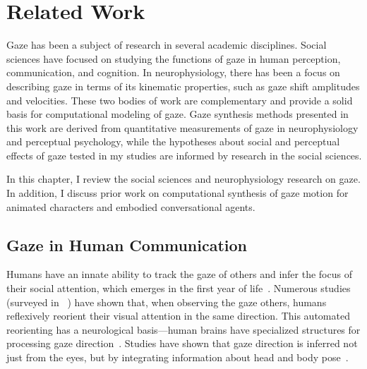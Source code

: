 \pagestyle{deposit}

\chapter{Related Work}

Gaze has been a subject of research in several academic disciplines. Social sciences have focused on studying the functions of gaze in human perception, communication, and cognition. In neurophysiology, there has been a focus on describing gaze in terms of its kinematic properties, such as gaze shift amplitudes and velocities. These two bodies of work are complementary and provide a solid basis for computational modeling of gaze. Gaze synthesis methods presented in this work are derived from quantitative measurements of gaze in neurophysiology and perceptual psychology, while the hypotheses about social and perceptual effects of gaze tested in my studies are informed by research in the social sciences.

In this chapter, I review the social sciences and neurophysiology research on gaze. In addition, I discuss prior work on computational synthesis of gaze motion for animated characters and embodied conversational agents.

\section{Gaze in Human Communication}
\label{sec:GazeHumanCommunication}

Humans have an innate ability to track the gaze of others and infer the focus of their social attention, which emerges in the first year of life~\cite{scaife1975infant,vecera1995detection}. Numerous studies (surveyed in ~\cite{langton2000eyes}) have shown that, when observing the gaze others, humans reflexively reorient their visual attention in the same direction. This automated reorienting has a neurological basis---human brains have specialized structures for processing gaze direction~\cite{emery2000eyes}. Studies have shown that gaze direction is inferred not just from the eyes, but by integrating information about head and body pose~\cite{hietanen1999does,langton2000eyes,hietanen2002social,pomianowska2011socialcues}.

